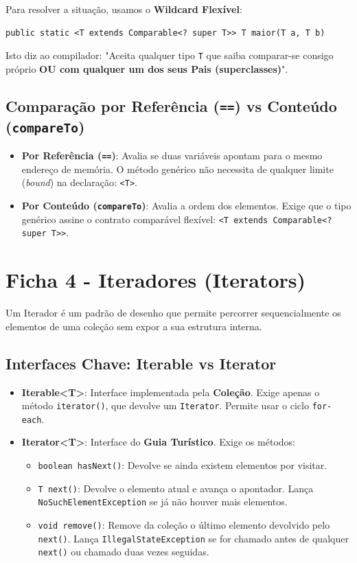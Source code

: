 \documentclass[12pt,a4paper]{article}
\begin{document}
\begin{enumerate}
Para resolver a situação, usamos o \textbf{Wildcard Flexível}:
\begin{verbatim}
public static <T extends Comparable<? super T>> T maior(T a, T b)
\end{verbatim}
Isto diz ao compilador: "Aceita qualquer tipo \texttt{T} que saiba comparar-se consigo próprio \textbf{OU com qualquer um dos seus Pais (superclasses)}".

\subsection*{Comparação por Referência (\texttt{==}) vs Conteúdo (\texttt{compareTo})}
\begin{itemize}
    \item \textbf{Por Referência (\texttt{==})}: Avalia se duas variáveis apontam para o mesmo endereço de memória. O método genérico não necessita de qualquer limite (\textit{bound}) na declaração: \texttt{<T>}.
    \item \textbf{Por Conteúdo (\texttt{compareTo})}: Avalia a ordem dos elementos. Exige que o tipo genérico assine o contrato comparável flexível: \texttt{<T extends Comparable<? super T>>}.
\end{itemize}



\section{Ficha 4 - Iteradores (Iterators)}
Um Iterador é um padrão de desenho que permite percorrer sequencialmente os elementos de uma coleção sem expor a sua estrutura interna.

\subsection*{Interfaces Chave: Iterable vs Iterator}
\begin{itemize}
    \item \textbf{Iterable<T>}: Interface implementada pela \textbf{Coleção}. Exige apenas o método \texttt{iterator()}, que devolve um \texttt{Iterator}. Permite usar o ciclo \texttt{for-each}.
    \item \textbf{Iterator<T>}: Interface do \textbf{Guia Turístico}. Exige os métodos:
    \begin{itemize}
        \item \texttt{boolean hasNext()}: Devolve se ainda existem elementos por visitar.
        \item \texttt{T next()}: Devolve o elemento atual e avança o apontador. Lança \texttt{NoSuchElementException} se já não houver mais elementos.
        \item \texttt{void remove()}: Remove da coleção o último elemento devolvido pelo \texttt{next()}. Lança \texttt{IllegalStateException} se for chamado antes de qualquer \texttt{next()} ou chamado duas vezes seguidas.
    \end{itemize}
\end{itemize}


\end{enumerate}
\end{document}
